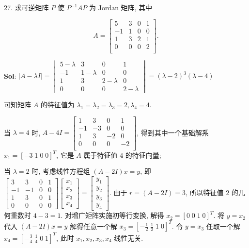 

27. 求可逆矩阵 $P$ 使 $P^{-1}AP$ 为 $\text{Jordan}$ 矩阵, 其中

$$
A=
\begin{bmatrix}
    5&3&0&1\\
    -1&1&0&0\\
    1&3&2&1\\
    0&0&0&2\\
\end{bmatrix}.
$$

\textbf{Sol}: $|A-\lambda I|=\begin{vmatrix}
5-\lambda & 3 & 0 & 1\\
-1 & 1-\lambda & 0 & 0\\
1&3&2-\lambda&0\\
0&0&0&2-\lambda
\end{vmatrix}=(\lambda-2)^3(\lambda-4)$

可知矩阵 $A$ 的特征值为 $\lambda_1=\lambda_2=\lambda_3=2,\lambda_4=4$.

当 $\lambda=4$ 时, $A-4I=\begin{bmatrix}
    1&3&0&1\\
    -1&-3&0&0\\
    1&3&-2&0\\
    0&0&0&-2\\
\end{bmatrix}$, 得到其中一个基础解系 $x_1=[-3\;1\;0\;0]^T$, 它是 $A$ 属于特征值 $4$ 的特征向量;

当 $\lambda=2$ 时, 考虑线性方程组 $(A-2I)x=y$, 即 $\begin{bmatrix}
    3&3&0&1\\
    -1&-1&0&0\\
    1&3&0&1\\
    0&0&0&0
\end{bmatrix}\begin{bmatrix}
    x_1\\x_2\\x_3\\x_4
\end{bmatrix}=\begin{bmatrix}
    y_1\\y_2\\y_3\\y_4
\end{bmatrix}$. 
由于 $r=(A-2I)=3$, 所以特征值 $2$ 的几何重数时 $4-3=1$. 对增广矩阵实施初等行变换, 解得 $x_2=[0\;0\;1\;0]^T$. 将 $y=x_2$ 代入 $(A-2I)x=y$ 解得任意一个解 $x_3=[-\frac{1}{2}\;\frac{1}{2}\;1\;0]^T$. 令 $y=x_3$ 任取一个解 $x_4=[-\frac{3}{4}\;\frac{1}{4}\;0\;1]^T$, 此时 $x_1,x_2,x_3,x_4$ 线性无关.

